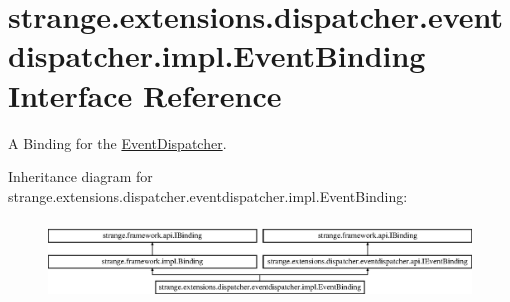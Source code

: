 \hypertarget{classstrange_1_1extensions_1_1dispatcher_1_1eventdispatcher_1_1impl_1_1_event_binding}{\section{strange.\-extensions.\-dispatcher.\-eventdispatcher.\-impl.\-Event\-Binding Interface Reference}
\label{classstrange_1_1extensions_1_1dispatcher_1_1eventdispatcher_1_1impl_1_1_event_binding}
}


A Binding for the \hyperlink{classstrange_1_1extensions_1_1dispatcher_1_1eventdispatcher_1_1impl_1_1_event_dispatcher}{Event\-Dispatcher}.  


Inheritance diagram for strange.\-extensions.\-dispatcher.\-eventdispatcher.\-impl.\-Event\-Binding\-:\begin{figure}[H]
\begin{center}
\leavevmode
\includegraphics[height=2.176166cm]{classstrange_1_1extensions_1_1dispatcher_1_1eventdispatcher_1_1impl_1_1_event_binding}
\end{center}
\end{figure}
